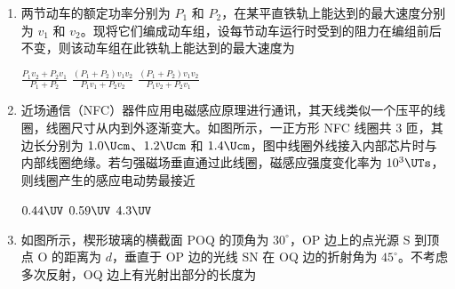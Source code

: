 \documentclass[\gkver]{gaokaozhenti}
\begin{document}
\begin{enumerate}
\item
两节动车的额定功率分别为 $P_{1}$ 和 $P_{2}$，在某平直铁轨上能达到的最大速度分别为 $v_{1}$ 和 $v_{2}$。现将它们编成动车组，设每节动车运行时受到的阻力在编组前后不变，则该动车组在此铁轨上能达到的最大速度为 

{$\frac{P_{1}v_{2} + P_{2}v_{1}}{P_{1} + P_{2}}$}
{$\frac{(P_{1} + P_{2})v_{1}v_{2}}{P_{1}v_{1} + P_{2}v_{2}}$}
{$\frac{(P_{1} + P_{2})v_{1}v_{2}}{P_{1}v_{2} + P_{2}v_{1}}$}


\item
近场通信（NFC）器件应用电磁感应原理进行通讯，其天线类似一个压平的线圈，线圈尺寸从内到外逐渐变大。如图所示，一正方形 NFC 线圈共 3 匝，其边长分别为 $1.0\Ucm$、$1.2\Ucm$ 和 $1.4\Ucm$，图中线圈外线接入内部芯片时与内部线圈绝缘。若匀强磁场垂直通过此线圈，磁感应强度变化率为 $10^{3}\UTs$，则线圈产生的感应电动势最接近 


\fourchoices[answer=B]
{$0.30\UV$}
{$0.44\UV$}
{$0.59\UV$}
{$4.3\UV$}


\item
如图所示，楔形玻璃的横截面 POQ 的顶角为 $30^\circ$，OP 边上的点光源 S 到顶点 O 的距离为 $d$，垂直于 OP 边的光线 SN 在 OQ 边的折射角为 $45^\circ$。不考虑多次反射，OQ 边上有光射出部分的长度为 


\end{enumerate}
\end{document}
